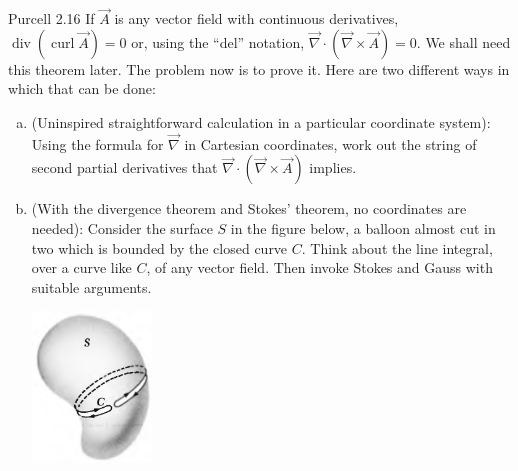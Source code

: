 \documentclass{esg8022pset}
\begin{document}
\begin{problem}{Purcell 2.16}
  If $\vec A$ is any vector field with continuous derivatives, $\operatorname{div}(\operatorname{curl}\vec A) = 0$ or, using the ``del'' notation, $\vec \nabla \cdot (\vec \nabla \times \vec A) = 0$. We shall need this theorem later. The problem now is to prove it. Here are two different ways in which that can be done: 
  \begin{enumerate}[(a)]
    \item (Uninspired straightforward calculation in a particular coordinate system): Using the formula for $\vec\nabla$ in Cartesian coordinates, work out the string of second partial derivatives that $\vec \nabla \cdot (\vec \nabla \times \vec A)$ implies. 
    \item (With the divergence theorem and Stokes' theorem, no coordinates are needed): Consider the surface $S$ in the figure below, a balloon almost cut in two which is bounded by the closed curve $C$. Think about the line integral, over a curve like $C$, of any vector field. Then invoke Stokes and Gauss with suitable arguments.
      \begin{center}\includegraphics[width=0.25\textwidth]{ps03_02}\end{center}
  \end{enumerate}
\end{problem}
\end{document}
